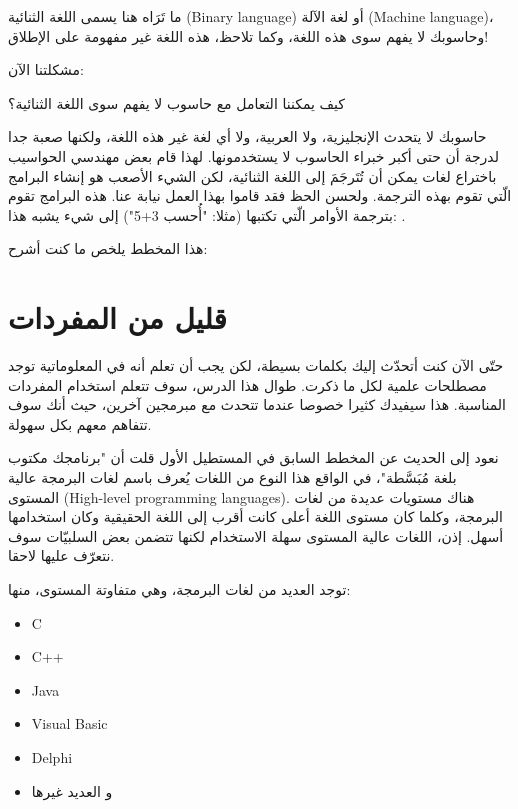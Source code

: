 ما تَرَاه هنا يسمى اللغة الثنائية
(\textenglish{Binary language})
أو لغة الآلة
(\textenglish{Machine language})،
وحاسوبك لا يفهم سوى هذه اللغة، وكما تلاحظ، هذه اللغة غير مفهومة على الإطلاق!

مشكلتنا الآن:
\begin{question}
  كيف يمكننا التعامل مع حاسوب لا يفهم سوى اللغة الثنائية؟
\end{question}

حاسوبك لا يتحدث الإنجليزية، ولا العربية، ولا أي لغة غير هذه اللغة، ولكنها صعبة جدا لدرجة أن حتى أكبر خبراء الحاسوب لا يستخدمونها.
لهذا قام بعض مهندسي الحواسيب باختراع لغات يمكن أن تُتَرجَمَ إلى اللغة الثنائية، لكن الشيء الأصعب هو إنشاء البرامج الّتي تقوم بهذه الترجمة. ولحسن الحظ فقد قاموا بهذا العمل نيابة عنا. هذه البرامج تقوم بترجمة الأوامر الّتي تكتبها (مثلا: "أُحسب 3+5") إلى شيء يشبه هذا:
.

هذا المخطط يلخص ما كنت أشرح:


\section{قليل من المفردات}
حتّى الآن كنت أتحدّث إليك بكلمات بسيطة، لكن يجب أن تعلم أنه في المعلوماتية توجد مصطلحات علمية لكل ما ذكرت. طوال هذا الدرس، سوف تتعلم استخدام المفردات المناسبة. هذا سيفيدك كثيرا خصوصا عندما تتحدث مع مبرمجين آخرين، حيث أنك سوف تتفاهم معهم بكل سهولة.

نعود إلى الحديث عن المخطط السابق في المستطيل الأول قلت أن "برنامجك مكتوب بلغة مُبَسَّطة"، في الواقع هذا النوع من اللغات يُعرف باسم لغات البرمجة عالية المستوى (\textenglish{High-level programming languages}). هناك مستويات عديدة من لغات البرمجة، وكلما كان مستوى اللغة أعلى كانت أقرب إلى اللغة الحقيقية وكان استخدامها أسهل. إذن، اللغات عالية المستوى سهلة الاستخدام لكنها تتضمن بعض السلبيّات سوف نتعرّف عليها لاحقا.

توجد العديد من لغات البرمجة، وهي متفاوتة المستوى، منها:
\begin{itemize}
  \item \textenglish{C}
  \item \textenglish{C++}
  \item \textenglish{Java}
  \item \textenglish{Visual Basic}
  \item \textenglish{Delphi}
  \item و العديد غيرها
\end{itemize}

